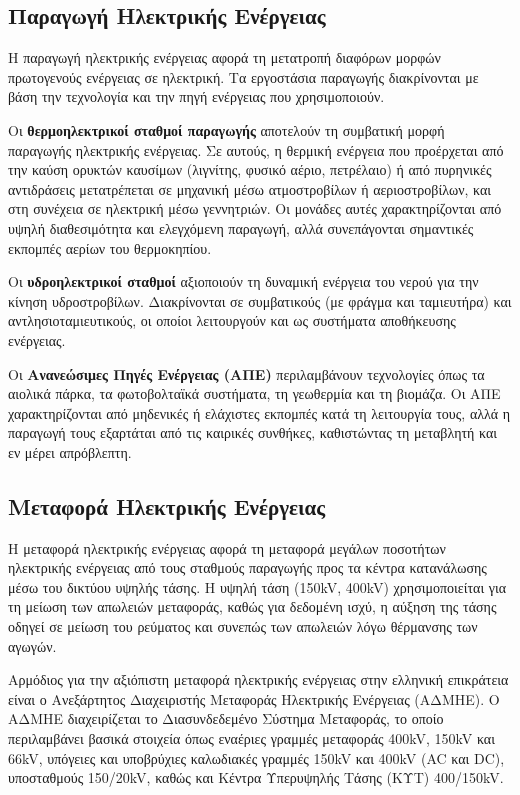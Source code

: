 \subsection{Παραγωγή Ηλεκτρικής Ενέργειας}
\label{subsec:generation}

Η παραγωγή ηλεκτρικής ενέργειας αφορά τη μετατροπή διαφόρων μορφών πρωτογενούς ενέργειας σε ηλεκτρική. Τα εργοστάσια παραγωγής διακρίνονται με βάση την τεχνολογία και την πηγή ενέργειας που χρησιμοποιούν.

Οι \textbf{θερμοηλεκτρικοί σταθμοί παραγωγής} αποτελούν τη συμβατική μορφή παραγωγής ηλεκτρικής ενέργειας. Σε αυτούς, η θερμική ενέργεια που προέρχεται από την καύση ορυκτών καυσίμων (λιγνίτης, φυσικό αέριο, πετρέλαιο) ή από πυρηνικές αντιδράσεις μετατρέπεται σε μηχανική μέσω ατμοστροβίλων ή αεριοστροβίλων, και στη συνέχεια σε ηλεκτρική μέσω γεννητριών. Οι μονάδες αυτές χαρακτηρίζονται από υψηλή διαθεσιμότητα και ελεγχόμενη παραγωγή, αλλά συνεπάγονται σημαντικές εκπομπές αερίων του θερμοκηπίου.

Οι \textbf{υδροηλεκτρικοί σταθμοί} αξιοποιούν τη δυναμική ενέργεια του νερού για την κίνηση υδροστροβίλων. Διακρίνονται σε συμβατικούς (με φράγμα και ταμιευτήρα) και αντλησιοταμιευτικούς, οι οποίοι λειτουργούν και ως συστήματα αποθήκευσης ενέργειας.

Οι \textbf{Ανανεώσιμες Πηγές Ενέργειας (ΑΠΕ)} περιλαμβάνουν τεχνολογίες όπως τα αιολικά πάρκα, τα φωτοβολταϊκά συστήματα, τη γεωθερμία και τη βιομάζα. Οι ΑΠΕ χαρακτηρίζονται από μηδενικές ή ελάχιστες εκπομπές κατά τη λειτουργία τους, αλλά η παραγωγή τους εξαρτάται από τις καιρικές συνθήκες, καθιστώντας τη μεταβλητή και εν μέρει απρόβλεπτη.

\subsection{Μεταφορά Ηλεκτρικής Ενέργειας}
\label{subsec:transmission}

Η μεταφορά ηλεκτρικής ενέργειας αφορά τη μεταφορά μεγάλων ποσοτήτων ηλεκτρικής ενέργειας από τους σταθμούς παραγωγής προς τα κέντρα κατανάλωσης μέσω του δικτύου υψηλής τάσης. Η υψηλή τάση (150kV, 400kV) χρησιμοποιείται για τη μείωση των απωλειών μεταφοράς, καθώς για δεδομένη ισχύ, η αύξηση της τάσης οδηγεί σε μείωση του ρεύματος και συνεπώς των απωλειών λόγω θέρμανσης των αγωγών.

Αρμόδιος για την αξιόπιστη μεταφορά ηλεκτρικής ενέργειας στην ελληνική επικράτεια είναι ο Ανεξάρτητος Διαχειριστής Μεταφοράς Ηλεκτρικής Ενέργειας (ΑΔΜΗΕ). Ο ΑΔΜΗΕ διαχειρίζεται το Διασυνδεδεμένο Σύστημα Μεταφοράς, το οποίο περιλαμβάνει βασικά στοιχεία όπως εναέριες γραμμές μεταφοράς 400kV, 150kV και 66kV, υπόγειες και υποβρύχιες καλωδιακές γραμμές 150kV και 400kV (AC και DC), υποσταθμούς 150/20kV, καθώς και Κέντρα Υπερυψηλής Τάσης (ΚΥΤ) 400/150kV.

